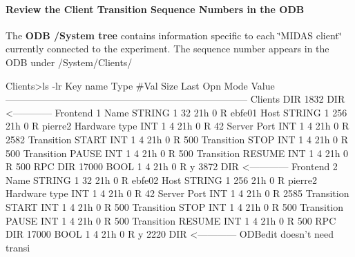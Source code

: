 \par
 \hypertarget{RC_Run_States_and_Transitions_RC_Review_Seq_Num}{}\paragraph{Review the Client Transition Sequence Numbers in the ODB}\label{RC_Run_States_and_Transitions_RC_Review_Seq_Num}
\label{RC_Run_States_and_Transitions_RC_odb_system_tree}
\hypertarget{RC_Run_States_and_Transitions_RC_odb_system_tree}{}
 \label{RC_Run_States_and_Transitions_idx_ODB_tree_System}
\hypertarget{RC_Run_States_and_Transitions_idx_ODB_tree_System}{}
 The {\bfseries  ODB /System tree } contains information specific to each \char`\"{}MIDAS client\char`\"{} currently connected to the experiment. The sequence number appears in the ODB under /System/Clients/ 
\begin{DoxyCode}
Clients>ls -lr
Key name                        Type    #Val  Size  Last Opn Mode Value
---------------------------------------------------------------------------
Clients                         DIR
    1832                        DIR     <------------ Frontend 1
        Name                    STRING  1     32    21h  0   R    ebfe01
        Host                    STRING  1     256   21h  0   R    pierre2
        Hardware type           INT     1     4     21h  0   R    42
        Server Port             INT     1     4     21h  0   R    2582
        Transition START        INT     1     4     21h  0   R    500
        Transition STOP         INT     1     4     21h  0   R    500
        Transition PAUSE        INT     1     4     21h  0   R    500
        Transition RESUME       INT     1     4     21h  0   R    500
        RPC                     DIR
            17000               BOOL    1     4     21h  0   R    y
    3872                        DIR     <------------ Frontend 2 
        Name                    STRING  1     32    21h  0   R    ebfe02
        Host                    STRING  1     256   21h  0   R    pierre2
        Hardware type           INT     1     4     21h  0   R    42
        Server Port             INT     1     4     21h  0   R    2585
        Transition START        INT     1     4     21h  0   R    500
        Transition STOP         INT     1     4     21h  0   R    500
        Transition PAUSE        INT     1     4     21h  0   R    500
        Transition RESUME       INT     1     4     21h  0   R    500
        RPC                     DIR
            17000               BOOL    1     4     21h  0   R    y
    2220                        DIR     <------------ ODBedit doesn't need transi

\end{DoxyCode}
